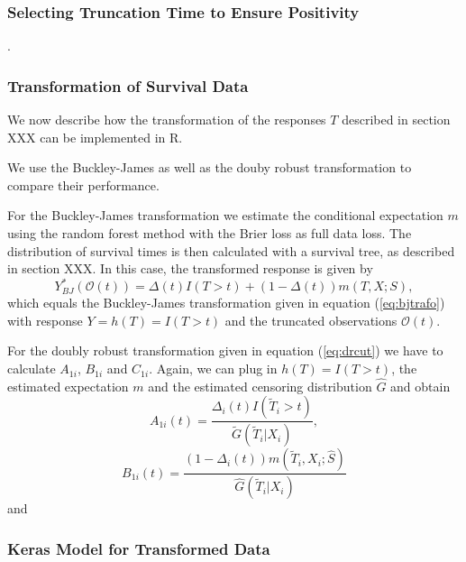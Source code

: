 \documentclass[12pt, a4paper]{article}
\theoremstyle{definition}
\theoremstyle{plain}
\numberwithin{equation}{section}
\numberwithin{figure}{section}
\numberwithin{table}{section}
\begin{document}
	
	\subsubsection{Selecting Truncation Time to Ensure Positivity}
	
	\citet*{drtrees}.
	
	\subsubsection{Transformation of Survival Data}
	
	We now describe how the transformation of the responses $T$ described in section XXX can be implemented in R.
	
	We use the Buckley-James as well as the douby robust transformation to compare their performance.
	
	For the Buckley-James transformation we estimate the conditional expectation $m$ using the random forest method with the Brier loss as full data loss.
	The distribution of survival times is then calculated with a survival tree, as described in section XXX.
	In this case, the transformed response is given by
	\begin{equation*}
	Y^*_{BJ}(\mathcal{O}(t)) = \Delta(t)I(T>t)+ (1-\Delta(t))m(T, X; S),
	\end{equation*}
	which equals the Buckley-James transformation given in equation (\ref{eq:bjtrafo}) with response $Y=h(T)=I(T>t)$ and the truncated observations $\mathcal{O}(t)$.
	
	For the doubly robust transformation given in equation (\ref{eq:drcut}) we have to calculate $A_{1i}$, $B_{1i}$ and $C_{1i}$.
	Again, we can plug in $h(T)=I(T>t)$, the estimated expectation $m$ and the estimated censoring distribution $\hat{G}$ and obtain
	\begin{equation*}
		A_{1i}(t)=\frac{\Delta_i(t)I(\tilde{T}_i >t)}{\tilde{G}(\tilde{T}_i\vert X_i)},
	\end{equation*}
	\begin{equation*}
		B_{1i}(t) = \frac{(1-\Delta_i(t))m(\tilde{T}_i, X_i; \hat{S})}{\hat{G}(\tilde{T}_i \vert X_i)}
	\end{equation*}
	and
	
	\subsubsection{Keras Model for Transformed Data}
	
\end{document}
